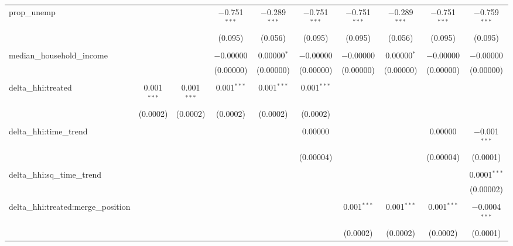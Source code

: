 \begin{table}[H]
{\begin{tabular}{@{\extracolsep{5pt}}lccccccccc}
  prop\_unemp &  &  & $-$0.751$^{***}$ & $-$0.289$^{***}$ & $-$0.751$^{***}$ & $-$0.751$^{***}$ & $-$0.289$^{***}$ & $-$0.751$^{***}$ & $-$0.759$^{***}$ \\  

   &  &  & (0.095) & (0.056) & (0.095) & (0.095) & (0.056) & (0.095) & (0.095) \\  

   & & & & & & & & & \\  

  median\_household\_income &  &  & $-$0.00000 & 0.00000$^{*}$ & $-$0.00000 & $-$0.00000 & 0.00000$^{*}$ & $-$0.00000 & $-$0.00000 \\  

   &  &  & (0.00000) & (0.00000) & (0.00000) & (0.00000) & (0.00000) & (0.00000) & (0.00000) \\  

   & & & & & & & & & \\  

  delta\_hhi:treated & 0.001$^{***}$ & 0.001$^{***}$ & 0.001$^{***}$ & 0.001$^{***}$ & 0.001$^{***}$ &  &  &  &  \\  

   & (0.0002) & (0.0002) & (0.0002) & (0.0002) & (0.0002) &  &  &  &  \\  

   & & & & & & & & & \\  

  delta\_hhi:time\_trend &  &  &  &  & 0.00000 &  &  & 0.00000 & $-$0.001$^{***}$ \\  

   &  &  &  &  & (0.00004) &  &  & (0.00004) & (0.0001) \\  

   & & & & & & & & & \\  

  delta\_hhi:sq\_time\_trend &  &  &  &  &  &  &  &  & 0.0001$^{***}$ \\  

   &  &  &  &  &  &  &  &  & (0.00002) \\  

   & & & & & & & & & \\  

  delta\_hhi:treated:merge\_position &  &  &  &  &  & 0.001$^{***}$ & 0.001$^{***}$ & 0.001$^{***}$ & $-$0.0004$^{***}$ \\  

   &  &  &  &  &  & (0.0002) & (0.0002) & (0.0002) & (0.0001) \\  


\end{tabular}}
\end{table}

